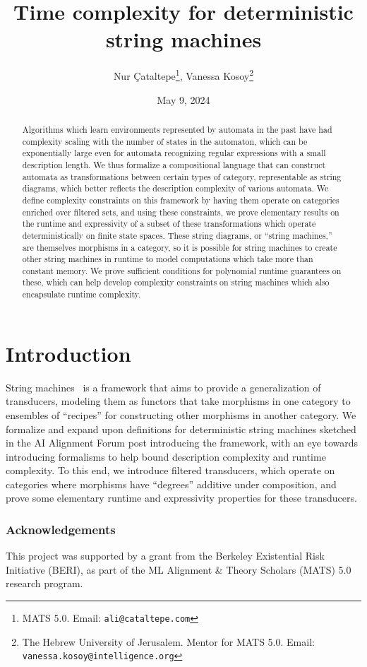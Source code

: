 \documentclass{article}
\title{Time complexity for deterministic string machines}
\author{Nur \c{C}ataltepe\thanks{MATS 5.0. Email: \texttt{ali@cataltepe.com}}, Vanessa Kosoy\thanks{The Hebrew University of Jerusalem.
Mentor for MATS 5.0. Email: \texttt{vanessa.kosoy@intelligence.org}}}
\date{May 9, 2024}
\theoremstyle{definition}
\theoremstyle{remark}
\begin{document}
\maketitle

\begin{abstract}
\noindent
Algorithms which learn environments represented by automata in the past have
had complexity scaling with the number of states in the automaton, which can
be exponentially large even for automata recognizing regular
expressions with
a small description length. We thus formalize a compositional 
language that can construct automata as transformations
between certain types
of category, representable as string diagrams, which better
reflects the description complexity of various automata. We
define complexity constraints on this framework by having them
operate on categories enriched over filtered sets, and using these
constraints, we prove
elementary results on the runtime and expressivity of a subset of these
transformations which operate deterministically on finite state spaces.
These string diagrams, or ``string machines,'' are themselves morphisms
in a category, so it is possible for string machines to create other
string machines in runtime to model computations which take more
than constant memory.
We prove sufficient conditions for polynomial
runtime guarantees on these, which can
help develop complexity constraints on string
machines which also encapsulate
runtime complexity.
\end{abstract}
\section{Introduction}
 String machines~\cite{kosoy2023compositional} is a framework that
 aims to provide a generalization of transducers, modeling them as
 functors that take morphisms in one category to ensembles 
 of ``recipes'' for constructing other morphisms in another category.
 We formalize and expand upon definitions for
 deterministic string machines sketched in the AI
 Alignment Forum post introducing the framework, with an eye towards
 introducing formalisms to help bound description complexity and
 runtime complexity. To this end, we introduce filtered
 transducers, which operate on categories where morphisms
 have ``degrees'' additive under composition, and prove some elementary
 runtime and expressivity properties for these transducers.

\subsubsection*{Acknowledgements}
This project was supported by a grant from the Berkeley Existential
Risk Initiative (BERI), as part of the ML Alignment \& Theory Scholars
(MATS) 5.0
research program.
\end{document}
